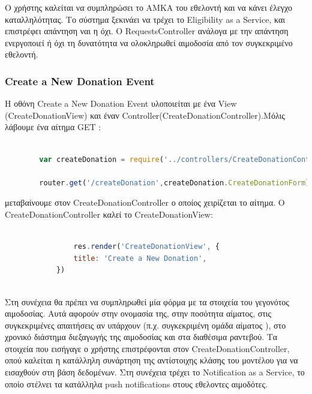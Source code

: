 		Ο χρήστης καλείται να συμπληρώσει το ΑΜΚΑ του εθελοντή και να κάνει έλεγχο καταλληλότητας. Το σύστημα ξεκινάει να τρέχει το Eligibility as a Service, και επιστρέφει απάντηση ναι η όχι. Ο RequestsController ανάλογα με την απάντηση ενεργοποιεί ή όχι τη δυνατότητα να ολοκληρωθεί αιμοδοσία από τον συγκεκριμένο εθελοντή. 
		
		
		
		\subsubsection{Create a New Donation Event}
		
		Η οθόνη Create a New Donation Event υλοποιείται με ένα View (CreateDonationView) και έναν Controller(CreateDonationController).Μόλις λάβουμε ένα αίτημα GET :
		
		\begin{lstlisting}[language=Javascript]			
		
		var createDonation = require('../controllers/CreateDonationController');
		
		router.get('/createDonation',createDonation.CreateDonationForm);  


		\end{lstlisting}
		

μεταβαίνουμε στον CreateDonationController ο οποίος χειρίζεται το αίτημα. O CreateDonationController καλεί το CreateDonationView:



		\begin{lstlisting}[language=Javascript]			
		
	            res.render('CreateDonationView', { 
                title: 'Create a New Donation',
			})
				
		\end{lstlisting}


	Στη συνέχεια θα πρέπει να συμπληρωθεί μία φόρμα με τα στοιχεία του γεγονότος αιμοδοσίας. Αυτά αφορούν στην ονομασία της, στην ποσότητα αίματος, στις συγκεκριμένες απαιτήσεις αν υπάρχουν (π.χ. συγκεκριμένη ομάδα αίματος ), στο χρονικό διάστημα διεξαγωγής της αιμοδοσίας και στα διαθέσιμα ραντεβού. Τα στοιχεία που εισήγαγε ο χρήστης επιστρέφονται στον CreateDonationController, οπού καλείται η κατάλληλη συνάρτηση της αντίστοιχης κλάσης του μοντέλου για να εισαχθούν στη βάση δεδομένων. Στη συνέχεια τρέχει το Notification as a Service, το οποίο στέλνει τα κατάλληλα push notifications στους εθελοντες αιμοδότες.
		
		
		
